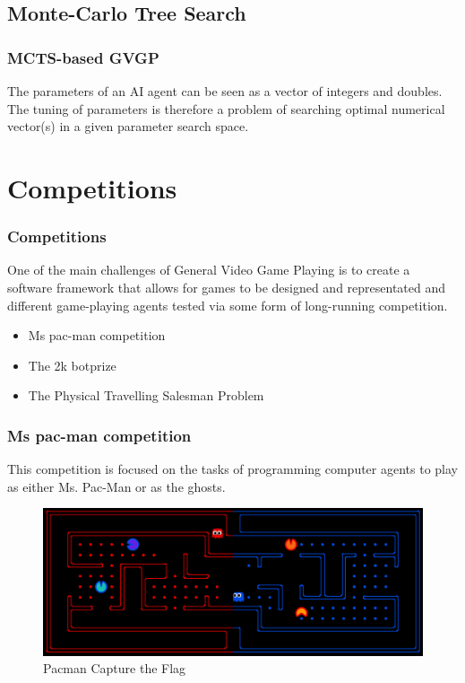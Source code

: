 \documentclass{beamer}
\begin{document}
\subsection{Monte-Carlo Tree Search}
\begin{frame}
\frametitle{MCTS-based GVGP\cite{10}}
The parameters of an AI agent can be seen as a vector of integers and doubles. The tuning of parameters is therefore a problem of searching optimal numerical vector(s) in a given parameter search space. %
\end{frame}

\section{Competitions}
\begin{frame}
  \frametitle{Competitions}
  One of the main challenges of General Video Game Playing is to create a software framework that allows for games to be designed and representated and different game-playing agents tested via some form of long-running competition. 
  \begin{itemize}
    \item Ms pac-man competition
    \item The 2k botprize
    \item The Physical Travelling Salesman Problem
  \end{itemize}
  
\end{frame}

\begin{frame}
  \frametitle{Ms pac-man competition\cite{2}}
  This competition is focused on the tasks of programming computer agents to play as either Ms. Pac-Man or as the ghosts.
  \begin{figure}
    \includegraphics[width=1\linewidth]{figures/pacman}
    \caption{Pacman Capture the Flag}
  \end{figure}

\end{frame}
\end{document}
